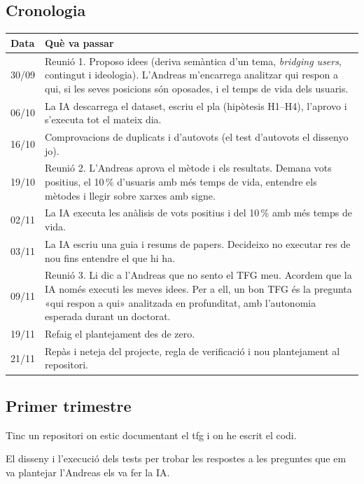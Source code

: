 \documentclass[11pt,a4paper]{article}
\begin{document}
\subsection{Cronologia}
\begin{center}
\small
\begin{tabularx}{\textwidth}{@{}lX@{}}
\toprule
\textbf{Data} & \textbf{Què va passar} \\
\midrule
30/09 & Reunió 1. Proposo idees (deriva semàntica d'un tema, \emph{bridging users}, contingut i ideologia). L'Andreas m'encarrega analitzar qui respon a qui, si les seves posicions són oposades, i el temps de vida dels usuaris. \\
06/10 & La IA descarrega el dataset, escriu el pla (hipòtesis H1--H4), l'aprovo i s'executa tot el mateix dia. \\
16/10 & Comprovacions de duplicats i d'autovots (el test d'autovots el dissenyo jo). \\
19/10 & Reunió 2. L'Andreas aprova el mètode i els resultats. Demana vots positius, el 10\,\% d'usuaris amb més temps de vida, entendre els mètodes i llegir sobre xarxes amb signe. \\
02/11 & La IA executa les anàlisis de vots positius i del 10\,\% amb més temps de vida. \\
03/11 & La IA escriu una guia i resums de papers. Decideixo no executar res de nou fins entendre el que hi ha. \\
09/11 & Reunió 3. Li dic a l'Andreas que no sento el TFG meu. Acordem que la IA només executi les meves idees. Per a ell, un bon TFG és la pregunta «qui respon a qui» analitzada en profunditat, amb l'autonomia esperada durant un doctorat. \\
19/11 & Refaig el plantejament des de zero. \\
21/11 & Repàs i neteja del projecte, regla de verificació i nou plantejament al repositori. \\
\bottomrule
\end{tabularx}
\end{center}

\subsection{Primer trimestre}

Tinc un repositori on estic documentant el tfg i on he escrit el codi.

El disseny i l'execució dels tests per trobar les respostes a les preguntes que em va plantejar l'Andreas els va fer la IA.
\end{document}
